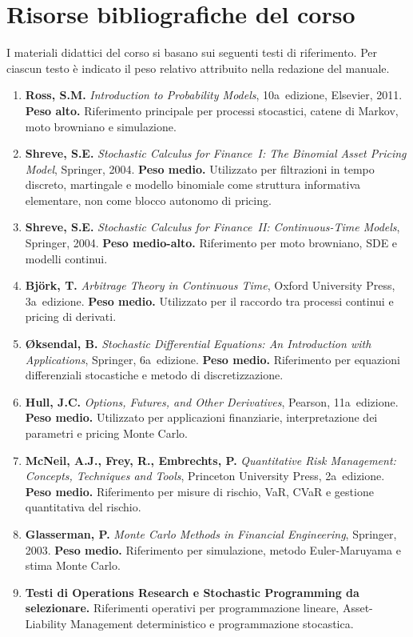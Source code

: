 \documentclass[12pt,a4paper]{article}%
\newcommand{\1}{\mathbf{1}}
\begin{document}
\section{Risorse bibliografiche del corso}

I materiali didattici del corso si basano sui seguenti testi di riferimento.
Per ciascun testo \`{e} indicato il peso relativo attribuito nella redazione
del manuale.

\begin{enumerate}
\item \textbf{Ross, S.M.} \textit{Introduction to Probability Models},
10a~edizione, Elsevier, 2011. \textbf{Peso alto.} Riferimento principale per
processi stocastici, catene di Markov, moto browniano e simulazione.

\item \textbf{Shreve, S.E.} \textit{Stochastic Calculus for Finance~I: The
Binomial Asset Pricing Model}, Springer, 2004. \textbf{Peso medio.} Utilizzato
per filtrazioni in tempo discreto, martingale e modello binomiale come
struttura informativa elementare, non come blocco autonomo di pricing.

\item \textbf{Shreve, S.E.} \textit{Stochastic Calculus for Finance~II:
Continuous-Time Models}, Springer, 2004. \textbf{Peso medio-alto.} Riferimento
per moto browniano, SDE e modelli continui.

\item \textbf{Bj\"{o}rk, T.} \textit{Arbitrage Theory in Continuous Time},
Oxford University Press, 3a~edizione. \textbf{Peso medio.} Utilizzato per il
raccordo tra processi continui e pricing di derivati.

\item \textbf{\O ksendal, B.} \textit{Stochastic Differential Equations: An
Introduction with Applications}, Springer, 6a~edizione. \textbf{Peso medio.}
Riferimento per equazioni differenziali stocastiche e metodo di discretizzazione.

\item \textbf{Hull, J.C.} \textit{Options, Futures, and Other Derivatives},
Pearson, 11a~edizione. \textbf{Peso medio.} Utilizzato per applicazioni
finanziarie, interpretazione dei parametri e pricing Monte Carlo.

\item \textbf{McNeil, A.J., Frey, R., Embrechts, P.} \textit{Quantitative Risk
Management: Concepts, Techniques and Tools}, Princeton University Press,
2a~edizione. \textbf{Peso medio.} Riferimento per misure di rischio, VaR, CVaR
e gestione quantitativa del rischio.

\item \textbf{Glasserman, P.} \textit{Monte Carlo Methods in Financial
Engineering}, Springer, 2003. \textbf{Peso medio.} Riferimento per
simulazione, metodo Euler-Maruyama e stima Monte Carlo.

\item \textbf{Testi di Operations Research e Stochastic Programming da
selezionare.} Riferimenti operativi per programmazione lineare,
Asset-Liability Management deterministico e programmazione stocastica.

\end{enumerate}
\end{document}
